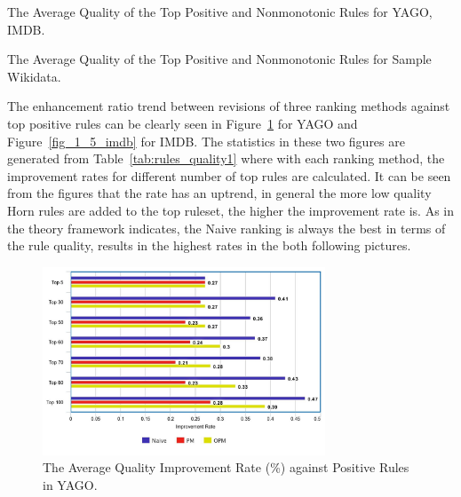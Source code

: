 \begin{table}[ht]
\centering
\footnotesize
\renewcommand*{\arraystretch}{1.07}
\centering

\smallskip
\caption{The Average Quality of the Top Positive and Nonmonotonic Rules for YAGO, IMDB.}
\label{tab:rules_quality1}
\end{table}

\begin{table}[ht]
\centering
\footnotesize
\renewcommand*{\arraystretch}{1.07}
\centering

\smallskip
\caption{The Average Quality of the Top Positive and Nonmonotonic Rules for Sample Wikidata.}
\label{tab:rules_quality2}
\end{table}

The enhancement ratio trend between revisions of three ranking methods against top positive rules can be clearly seen in Figure~\ref{fig_1_5_yago} for YAGO and Figure~\ref{fig_1_5_imdb} for IMDB. The statistics in these two figures are generated from Table~\ref{tab:rules_quality1} where with each ranking method, the improvement rates for different number of top rules are calculated. It can be seen from the figures that the rate has an uptrend, in general the more low quality Horn rules are added to the top ruleset, the higher the improvement rate is. As in the theory framework indicates, the Naive ranking is always the best in terms of the rule quality, results in the highest rates in the both following pictures.

\begin{figure}[ht]
\centering
\includegraphics[width=0.75\textwidth]{figures/table_1_5_yago.jpeg}
\caption{The Average Quality Improvement Rate (\%) against Positive Rules in YAGO.}
\label{fig_1_5_yago}
\end{figure}

